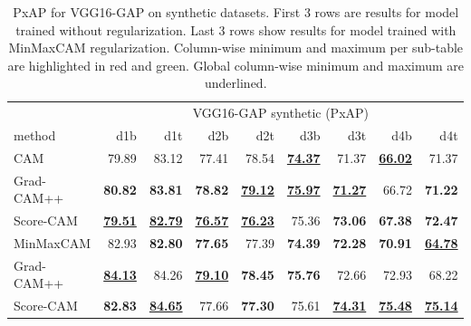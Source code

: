 \begin{table}[ht]
\centering
\begin{tabular}{lrrrrrrrr}
\toprule
 & \multicolumn{8}{c}{VGG16-GAP synthetic (PxAP)} \\
method & d1b & d1t & d2b & d2t & d3b & d3t & d4b & d4t \\
\cmidrule(lr){1-1} \cmidrule(lr){2-9} 
CAM & 79.89 & 83.12 & 77.41 & 78.54 & \color{purple} \bfseries \underline{74.37} & 71.37 & \color{purple} \bfseries \underline{66.02} & 71.37 \\
Grad-CAM++ & \color{teal} \bfseries 80.82 & \color{teal} \bfseries 83.81 & \color{teal} \bfseries 78.82 & \color{teal} \bfseries \underline{79.12} & \color{teal} \bfseries \underline{75.97} & \color{purple} \bfseries \underline{71.27} & 66.72 & \color{purple} \bfseries 71.22 \\
Score-CAM & \color{purple} \bfseries \underline{79.51} & \color{purple} \bfseries \underline{82.79} & \color{purple} \bfseries \underline{76.57} & \color{purple} \bfseries \underline{76.23} & 75.36 & \color{teal} \bfseries 73.06 & \color{teal} \bfseries 67.38 & \color{teal} \bfseries 72.47 \\
\cmidrule(lr){1-1} \cmidrule(lr){2-9} 
MinMaxCAM & 82.93 & \color{purple} \bfseries 82.80 & \color{purple} \bfseries 77.65 & 77.39 & \color{purple} \bfseries 74.39 & \color{purple} \bfseries 72.28 & \color{purple} \bfseries 70.91 & \color{purple} \bfseries \underline{64.78} \\
Grad-CAM++ & \color{teal} \bfseries \underline{84.13} & 84.26 & \color{teal} \bfseries \underline{79.10} & \color{teal} \bfseries 78.45 & \color{teal} \bfseries 75.76 & 72.66 & 72.93 & 68.22 \\
Score-CAM & \color{purple} \bfseries 82.83 & \color{teal} \bfseries \underline{84.65} & 77.66 & \color{purple} \bfseries 77.30 & 75.61 & \color{teal} \bfseries \underline{74.31} & \color{teal} \bfseries \underline{75.48} & \color{teal} \bfseries \underline{75.14} \\
\bottomrule
\end{tabular}
\caption[PxAP for VGG16-GAP on synthetic datasets]{PxAP for VGG16-GAP on synthetic datasets. First 3 rows are results for model trained without regularization. Last 3 rows show results for model trained with MinMaxCAM regularization. Column-wise minimum and maximum per sub-table are highlighted in red and green. Global column-wise minimum and maximum are underlined.}
\label{tab:pxap_vgg16_gap_synthetic}
\end{table}

